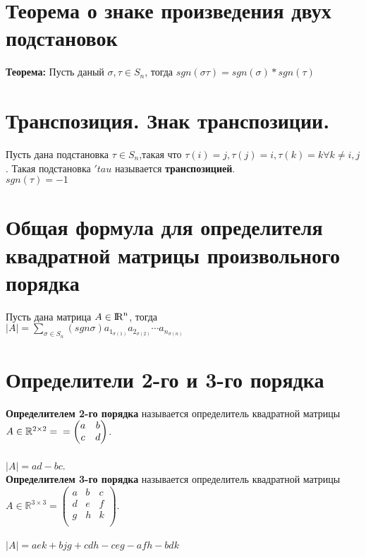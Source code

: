 \documentclass[a4paper,11pt]{report}
\DeclareMathOperator{\Mn}{{\rm I\!R}^{n}}
\begin{document}
\section{Теорема о знаке произведения двух подстановок}
\textbf{Теорема:} Пусть даный $\sigma, \tau \in S_n$, тогда $sgn(\sigma\tau) = sgn(\sigma) * sgn(\tau)$\\
\section{Транспозиция. Знак транспозиции.}
Пусть дана подстановка $\tau \in S_n$,такая что $\tau(i) = j, \tau(j) = i, \tau(k) = k \forall k \neq i, j$. 
Такая подстановка $'tau$ называется \textbf{транспозицией}.\\
$sgn(\tau) = -1$\\
\section{Общая формула для определителя квадратной матрицы произвольного порядка}
Пусть дана матрица $A \in \Mn$, тогда\\
$|A| = \sum\limits_{\sigma \in S_n}(sgn\sigma)a_1_{\sigma(1)}a_2_{\sigma(2)}\cdots{a_n_{\sigma(n)}}$
\section{Определители 2-го и 3-го порядка}
\textbf{Определителем 2-го порядка} называется определитель квадратной матрицы $A \in \mathbb{R}^{2\times{2}} = \\
= \begin{pmatrix}
a & b\\
c & d\\
\end{pmatrix}
$.\\\\
$|A| = ad - bc$.\\
\textbf{Определителем 3-го порядка} называется определитель квадратной матрицы $A \in \mathbb{R}^{3\times{3}} =
\begin{pmatrix}
 a & b & c\\
 d & e & f\\
 g & h & k\\
\end{pmatrix}
$.\\\\
$|A| = aek + bjg + cdh - ceg - afh - bdk$\\
\end{document}
